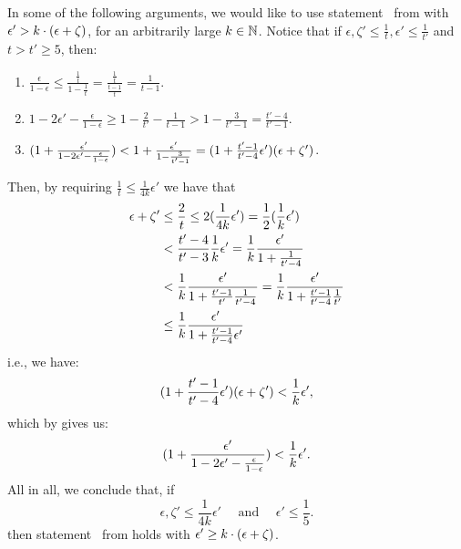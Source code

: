         \begin{remark} \label{rmk:value_for_even_partition_of_excellent_parts}
            In some of the following arguments, we would like to use statement ~from
             with $\epsilon' > k \cdot ( \epsilon + \zeta )$, for an arbitrarily large $k \in \mathbb{N}$.
            Notice that if $\epsilon, \zeta' \leq \frac{1}{t}, \epsilon' \leq \frac{1}{t'}$ and $t > t' \geq 5$, then:
            \begin{enumerate}[label={\Roman*}., ref={\Roman*}, font=\rmfamily]
                \item $\frac{\epsilon}{1-\epsilon} \leq \frac{\frac{1}{t}}{1-\frac{1}{t}} = \frac{\frac{1}{t}}{\frac{t-1}{t}}
                    = \frac{1}{t-1}$.
                \item $1 - 2 \epsilon' - \frac{\epsilon}{1-\epsilon} \geq 1 - \frac{2}{t'} - \frac{1}{t-1} > 1 - \frac{3}{t'-1}
                    = \frac{t'-4}{t'-1}$.
                \item \label{itm:value_for_even_partition_of_excellent_parts.c} $( 1 + \frac{\epsilon'}{1 - 2 \epsilon' - \frac{\epsilon}{1-\epsilon}} )
                    < 1 + \frac{\epsilon'}{1 - \frac{3}{t'-1}}
                    = ( 1 + \frac{t'-1}{t'-4} \epsilon' ) ( \epsilon + \zeta' )$.
            \end{enumerate}
            Then, by requiring $\frac{1}{t} \leq \frac{1}{4k}\epsilon'$ we have that
            \begin{align*}
                \epsilon + \zeta'
                    & \leq \frac{2}{t} \leq 2 ( \frac{1}{4k}\epsilon' ) = \frac{1}{2} ( \frac{1}{k}\epsilon' ) \\
                    & < \frac{t'-4}{t'- 3} \frac{1}{k} \epsilon' = \frac{1}{k} \frac{\epsilon'}{1 + \frac{1}{t'-4}} \\
                    & < \frac{1}{k} \frac{\epsilon'}{1 + \frac{t'-1}{t'}\frac{1}{t'-4}} = \frac{1}{k} \frac{\epsilon'}{1 + \frac{t'-1}{t'-4}\frac{1}{t'}} \\
                    & \leq \frac{1}{k} \frac{\epsilon'}{1 + \frac{t'-1}{t'-4}\epsilon'}
            \end{align*}
            i.e., we have:
            \[
                ( 1 + \frac{t'-1}{t'-4} \epsilon' ) ( \epsilon + \zeta' ) < \frac{1}{k} \epsilon',
            \]
            which by  gives us:
            \[
                ( 1 + \frac{\epsilon'}{1 - 2 \epsilon' - \frac{\epsilon}{1-\epsilon}} ) < \frac{1}{k} \epsilon'.
            \]
            All in all, we conclude that, if
            \[
                \epsilon, \zeta' \leq \frac{1}{4k} \epsilon' \quad \text{ and } \quad \epsilon' \leq \frac{1}{5}.
            \]
            then statement ~from
             holds with $\epsilon' \geq k \cdot ( \epsilon + \zeta )$.
        \end{remark}

